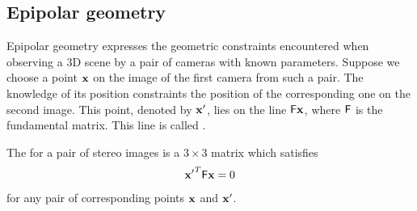 \begin{figure}[h]
  \label{fig:camera}
  \caption{} %
\end{figure}

\subsection{Epipolar geometry}
\label{sec:epi}

Epipolar geometry expresses the geometric constraints encountered when observing a 3D scene by a pair of cameras with known parameters. 
Suppose we choose a point $\mathbf{x}$ on the image of the first camera from such a pair.
The knowledge of its position constraints the position of the corresponding one on the second image.
This point, denoted by $\mathbf{x'}$, lies on the line $\mathsf{F}\mathbf{x}$, where $\mathsf{F}$ is the fundamental matrix.
This line is called .

\begin{definition}
The  for a pair of stereo images is a $3 \times 3$ matrix which satisfies 
\begin{align*}
\mathbf{x'}^T \mathsf{F} \mathbf{x} = 0
\end{align*}
for any pair of corresponding points $\mathbf{x}$ and $\mathbf{x'}$.
\end{definition}

